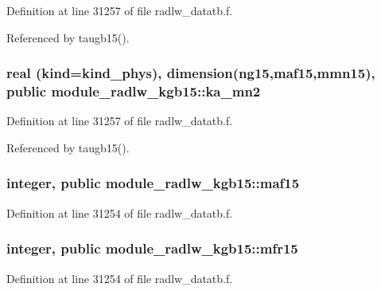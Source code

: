 Definition at line 31257 of file radlw\+\_\+datatb.\+f.



Referenced by taugb15().

\subsubsection[{\texorpdfstring{ka\+\_\+mn2}{ka_mn2}}]{\setlength{\rightskip}{0pt plus 5cm}real (kind=kind\+\_\+phys), dimension(ng15,{\bf maf15},{\bf mmn15}), public module\+\_\+radlw\+\_\+kgb15\+::ka\+\_\+mn2}\hypertarget{namespacemodule__radlw__kgb15_aff32d89fe8fef50ff79136cc7aa50526}{}\label{namespacemodule__radlw__kgb15_aff32d89fe8fef50ff79136cc7aa50526}


Definition at line 31257 of file radlw\+\_\+datatb.\+f.



Referenced by taugb15().

\subsubsection[{\texorpdfstring{maf15}{maf15}}]{\setlength{\rightskip}{0pt plus 5cm}integer, public module\+\_\+radlw\+\_\+kgb15\+::maf15}\hypertarget{namespacemodule__radlw__kgb15_a482858cf08fb1a14117dfbaa6a57fe8c}{}\label{namespacemodule__radlw__kgb15_a482858cf08fb1a14117dfbaa6a57fe8c}


Definition at line 31254 of file radlw\+\_\+datatb.\+f.

\subsubsection[{\texorpdfstring{mfr15}{mfr15}}]{\setlength{\rightskip}{0pt plus 5cm}integer, public module\+\_\+radlw\+\_\+kgb15\+::mfr15}\hypertarget{namespacemodule__radlw__kgb15_ad4d78009d0c7ffa27dbb228e68307675}{}\label{namespacemodule__radlw__kgb15_ad4d78009d0c7ffa27dbb228e68307675}


Definition at line 31254 of file radlw\+\_\+datatb.\+f.

